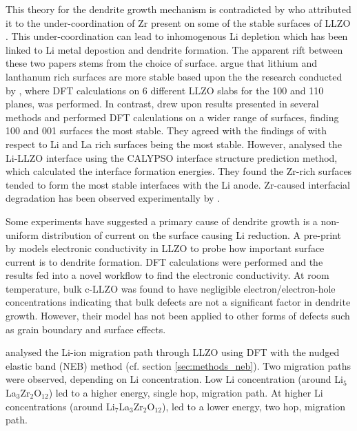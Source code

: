 \documentclass[../main.tex]{subfiles}
\begin{document}
This theory for the dendrite growth mechanism is contradicted by \citeauthor{Gao2020} who attributed it to the under-coordination of Zr present on some of the stable surfaces of LLZO .\cite{Gao2020} This under-coordination can lead to inhomogenous Li depletion which has been linked to Li metal depostion and dendrite formation.\cite{Tsai2016} The apparent rift between these two papers stems from the choice of surface. \citeauthor{Tian2018} argue that lithium and lanthanum rich surfaces are more stable based upon the the research conducted by \citeauthor{Thompson2017}, where DFT calculations on 6 different LLZO slabs for the 100 and 110 planes, was performed.\cite{Thompson2017} In contrast, \citeauthor{Gao2020} drew upon results presented in several methods\cite{Thompson2017, Canepa2018, Yu2016a} and performed DFT calculations on a wider range of surfaces, finding 100 and 001 surfaces the most stable. They agreed with the findings of \citeauthor{Tian2018} with respect to Li and La rich surfaces being the most stable. However, \citeauthor{Gao2020} analysed the Li-LLZO interface using the CALYPSO interface structure prediction method\cite{Wang2012, Gao2019}, which calculated the interface formation energies. They found the Zr-rich surfaces tended to form the most stable interfaces with the Li anode. Zr-caused interfacial degradation has been observed experimentally by \citeauthor{Zhu2019} \cite{Zhu2019}.

Some experiments have suggested a primary cause of dendrite growth is a non-uniform distribution of current on the surface causing Li reduction.\cite{Han2019_dendrite, Aguesse2017} A pre-print by \citeauthor{squires_2020} models electronic conductivity in LLZO to probe how important surface current is to dendrite formation.\cite{squires_2020} DFT calculations were performed and the results fed into a novel workflow to find the electronic conductivity. At room temperature, bulk c-LLZO was found to have negligible electron/electron-hole concentrations indicating that bulk defects are not a significant factor in dendrite growth. However, their model has not been applied to other forms of defects such as grain boundary and surface effects. 

\citeauthor{Xu2012} analysed the Li-ion migration path through LLZO using DFT with the nudged elastic band (NEB) method (cf. section \ref{sec:methods_neb}). Two migration paths were observed, depending on Li concentration.\cite{Xu2012} Low Li concentration (around Li$_5$La$_3$Zr$_2$O$_{12}$) led to a higher energy, single hop, migration path. At higher Li concentrations (around Li$_7$La$_3$Zr$_2$O$_{12}$), led to a lower energy, two hop, migration path.
\end{document}
